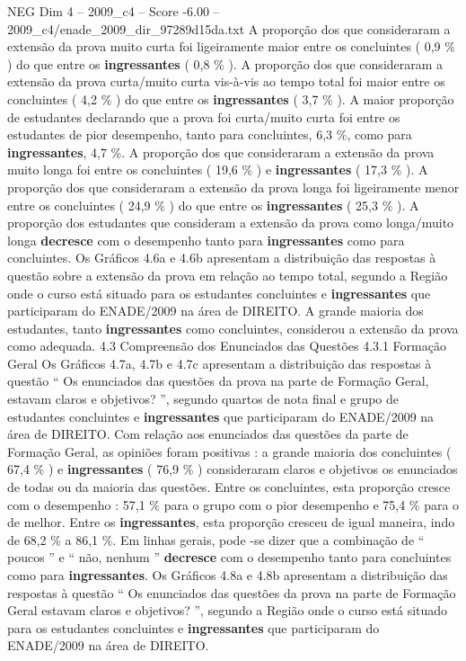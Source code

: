 \begin{textsample}{NEG Dim 4 – 2009\_c4 – Score -6.00 – 2009\_c4/enade\_2009\_dir\_97289d15da.txt}
A proporção dos que consideraram a extensão da prova muito curta foi ligeiramente maior entre os concluintes ( 0,9 \% ) do que entre os \textbf{ingressantes} ( 0,8 \% ).
A proporção dos que consideraram a extensão da prova curta/muito curta vis-à-vis ao tempo total foi maior entre os concluintes ( 4,2 \% ) do que entre os \textbf{ingressantes} ( 3,7 \% ).
A maior proporção de estudantes declarando que a prova foi curta/muito curta foi entre os estudantes de pior desempenho, tanto para concluintes, 6,3 \%, como para \textbf{ingressantes}, 4,7 \%.
A proporção dos que consideraram a extensão da prova muito longa foi entre os concluintes ( 19,6 \% ) e \textbf{ingressantes} ( 17,3 \% ).
A proporção dos que consideraram a extensão da prova longa foi ligeiramente menor entre os concluintes ( 24,9 \% ) do que entre os \textbf{ingressantes} ( 25,3 \% ).
A proporção dos estudantes que consideram a extensão da prova como longa/muito longa \textbf{decresce} com o desempenho tanto para \textbf{ingressantes} como para concluintes.
Os Gráficos 4.6a e 4.6b apresentam a distribuição das respostas à questão sobre a extensão da prova em relação ao tempo total, segundo a Região onde o curso está situado para os estudantes concluintes e \textbf{ingressantes} que participaram do ENADE/2009 na área de DIREITO.
A grande maioria dos estudantes, tanto \textbf{ingressantes} como concluintes, considerou a extensão da prova como adequada. 4.3 Compreensão dos Enunciados das Questões 4.3.1 Formação Geral Os Gráficos 4.7a, 4.7b e 4.7c apresentam a distribuição das respostas à questão “ Os enunciados das questões da prova na parte de Formação Geral, estavam claros e objetivos? ”, segundo quartos de nota final e grupo de estudantes concluintes e \textbf{ingressantes} que participaram do ENADE/2009 na área de DIREITO.
Com relação aos enunciados das questões da parte de Formação Geral, as opiniões foram positivas : a grande maioria dos concluintes ( 67,4 \% ) e \textbf{ingressantes} ( 76,9 \% ) consideraram claros e objetivos os enunciados de todas ou da maioria das questões.
Entre os concluintes, esta proporção cresce com o desempenho : 57,1 \% para o grupo com o pior desempenho e 75,4 \% para o de melhor.
Entre os \textbf{ingressantes}, esta proporção cresceu de igual maneira, indo de 68,2 \% a 86,1 \%.
Em linhas gerais, pode -se dizer que a combinação de “ poucos ” e “ não, nenhum ” \textbf{decresce} com o desempenho tanto para concluintes como para \textbf{ingressantes}.
Os Gráficos 4.8a e 4.8b apresentam a distribuição das respostas à questão “ Os enunciados das questões da prova na parte de Formação Geral estavam claros e objetivos? ”, segundo a Região onde o curso está situado para os estudantes concluintes e \textbf{ingressantes} que participaram do ENADE/2009 na área de DIREITO.

\end{textsample}

